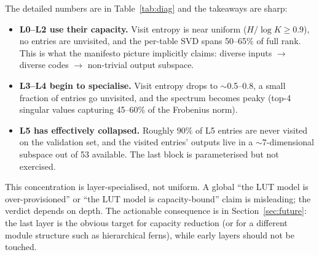 \documentclass[11pt]{article}
\begin{document}
The detailed numbers are in Table~\ref{tab:diag} and the takeaways are sharp:
\begin{itemize}
\setlength{\itemsep}{2pt}
    \item \textbf{L0--L2 use their capacity.} Visit entropy is near uniform ($H/\log K \ge 0.9$), no entries are unvisited, and the per-table SVD spans 50--65\% of full rank. This is what the manifesto picture implicitly claims: diverse inputs $\to$ diverse codes $\to$ non-trivial output subspace.
    \item \textbf{L3--L4 begin to specialise.} Visit entropy drops to $\sim$0.5--0.8, a small fraction of entries go unvisited, and the spectrum becomes peaky (top-4 singular values capturing 45--60\% of the Frobenius norm).
    \item \textbf{L5 has effectively collapsed.} Roughly $90\%$ of L5 entries are never visited on the validation set, and the visited entries' outputs live in a $\sim 7$-dimensional subspace out of 53 available. The last block is parameterised but not exercised.
\end{itemize}
This concentration is layer-specialised, not uniform.
A global ``the LUT model is over-provisioned'' or ``the LUT model is capacity-bound'' claim is misleading; the verdict depends on depth.
The actionable consequence is in Section~\ref{sec:future}: the last layer is the obvious target for capacity reduction (or for a different module structure such as hierarchical ferns), while early layers should not be touched.
\end{document}
